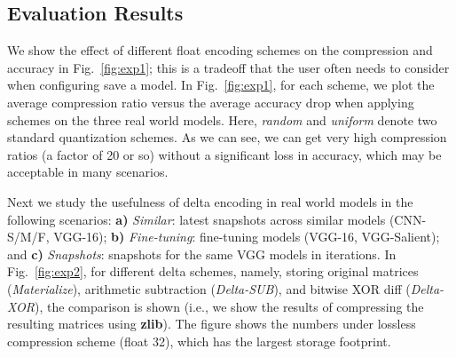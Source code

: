 \documentclass[conference]{IEEEtran}
\begin{document}

\subsection{Evaluation Results}

We show the effect of different float encoding schemes on the compression and accuracy in Fig.~\ref{fig:exp1}; this is a tradeoff that the user often needs to consider when configuring \modelhub\to save a model. In Fig.~\ref{fig:exp1}, for each scheme, we  plot the average compression ratio versus the average accuracy drop when applying \weightstore\float schemes on the three real world models. Here, {\em random} and {\em uniform} denote two standard quantization schemes. As we can see, we can get very high compression ratios (a factor of 20 or so) without a significant loss in accuracy, which may be acceptable in many scenarios.


Next we study the usefulness of delta encoding in real world models in the following scenarios: \textbf{a)} \emph{Similar}: latest snapshots across similar models (CNN-S/M/F, VGG-16); \textbf{b)} \emph{Fine-tuning}: fine-tuning models (VGG-16, VGG-Salient); and \textbf{c)} \emph{Snapshots}: snapshots for the same VGG models in \syntheticds\between iterations. 
In Fig.~\ref{fig:exp2}, for different delta schemes, namely, storing original matrices (\emph{Materialize}), arithmetic subtraction (\emph{Delta-SUB}), and bitwise XOR diff (\emph{Delta-XOR}), the comparison is shown (i.e., we show the results of compressing the resulting matrices using {\bf zlib}). %
The figure shows the numbers under lossless compression scheme (float 32), which has %
the largest storage footprint. 
\end{document}
